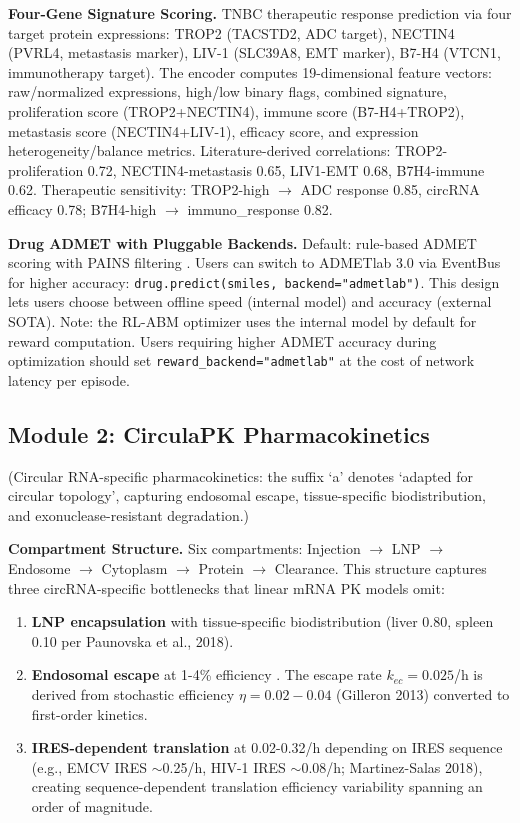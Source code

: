 \documentclass[11pt,a4paper]{article}
\begin{document}
\textbf{Four-Gene Signature Scoring.} TNBC therapeutic response prediction via four target protein expressions: TROP2 (TACSTD2, ADC target), NECTIN4 (PVRL4, metastasis marker), LIV-1 (SLC39A8, EMT marker), B7-H4 (VTCN1, immunotherapy target). The encoder computes 19-dimensional feature vectors: raw/normalized expressions, high/low binary flags, combined signature, proliferation score (TROP2+NECTIN4), immune score (B7-H4+TROP2), metastasis score (NECTIN4+LIV-1), efficacy score, and expression heterogeneity/balance metrics. Literature-derived correlations: TROP2-proliferation 0.72, NECTIN4-metastasis 0.65, LIV1-EMT 0.68, B7H4-immune 0.62. Therapeutic sensitivity: TROP2-high $\rightarrow$ ADC response 0.85, circRNA efficacy 0.78; B7H4-high $\rightarrow$ immuno\_response 0.82.

\textbf{Drug ADMET with Pluggable Backends.} Default: rule-based ADMET scoring with PAINS filtering \citep{baell2010}. Users can switch to ADMETlab 3.0 \citep{xiong2024} via EventBus for higher accuracy: \texttt{drug.predict(smiles, backend="admetlab")}. This design lets users choose between offline speed (internal model) and accuracy (external SOTA). Note: the RL-ABM optimizer uses the internal model by default for reward computation. Users requiring higher ADMET accuracy during optimization should set \texttt{reward\_backend="admetlab"} at the cost of network latency per episode.

\subsection{Module 2: CirculaPK Pharmacokinetics}

(Circular RNA-specific pharmacokinetics: the suffix `a' denotes `adapted for circular topology', capturing endosomal escape, tissue-specific biodistribution, and exonuclease-resistant degradation.)

\textbf{Compartment Structure.} Six compartments: Injection $\rightarrow$ LNP $\rightarrow$ Endosome $\rightarrow$ Cytoplasm $\rightarrow$ Protein $\rightarrow$ Clearance. This structure captures three circRNA-specific bottlenecks that linear mRNA PK models omit:

\begin{enumerate}
\item \textbf{LNP encapsulation} with tissue-specific biodistribution (liver 0.80, spleen 0.10 per Paunovska et al., 2018).
\item \textbf{Endosomal escape} at 1-4\% efficiency \citep{gilleron2013,hou2021}. The escape rate $k_{ec} = 0.025$/h is derived from stochastic efficiency $\eta = 0.02-0.04$ (Gilleron 2013) converted to first-order kinetics.
\item \textbf{IRES-dependent translation} at 0.02-0.32/h depending on IRES sequence (e.g., EMCV IRES $\sim$0.25/h, HIV-1 IRES $\sim$0.08/h; Martinez-Salas 2018), creating sequence-dependent translation efficiency variability spanning an order of magnitude.
\end{enumerate}
\end{document}
